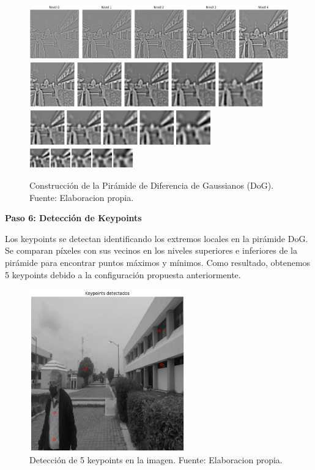 \documentclass[a4paper]{article}
\begin{document}
\begin{figure}[H]
    \centering
    \includegraphics[width=1.1\textwidth]{images/sift_paso_4.1.png}
    \includegraphics[width=0.9\textwidth]{images/sift_paso_4.2.png}
    \includegraphics[width=0.7\textwidth]{images/sift_paso_4.3.png}
    \includegraphics[width=0.4\textwidth]{images/sift_paso_4.4.png}
    \caption{Construcción de la Pirámide de Diferencia de Gaussianos (DoG). Fuente: Elaboracion propia.}
\end{figure}

\textbf{Paso 6: Detección de Keypoints}
\par\vspace{0.5cm}

Los keypoints se detectan identificando los extremos locales en la pirámide DoG. Se comparan píxeles con sus vecinos en los niveles superiores e inferiores de la pirámide para encontrar puntos máximos y mínimos. Como resultado, obtenemos 5 keypoints debido a la configuración propuesta anteriormente. 

\begin{figure}[H]
    \centering
    \includegraphics[width=0.6\textwidth]{images/sift_paso_5.1.png}
    \caption{Detección de 5 keypoints en la imagen. Fuente: Elaboracion propia.}
\end{figure}
\end{document}
